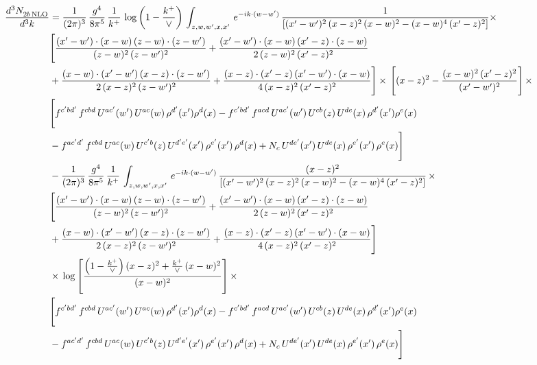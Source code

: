 \documentclass[9pt]{article}
\numberwithin{equation}{section}
\begin{document}
\begin{align}
    \frac{d^{3}N_{2b\,\rm NLO}^{\rm}}{d^{3}k}  & =  \frac{1}{(2\pi)^{3}}\, \frac{g^{4}}{8\pi^{5}}\,\frac{1}{k^{+}}\,\log{\left(1-\frac{k^{+}}{\vee}\right)}\,\int_{z,w,w^{\prime},x,x'}\, e^{-ik\cdot (w-w')}\, \frac{1}{\left[(x'-w')^{2}\,(x-z)^{2}\,(x-w)^{2} - (x-w)^{4}\, (x'-z)^{2}\right]} \times\notag \\ & \Bigg[\frac{(x'-w')\cdot (x-w)\, (z-w)\cdot (z-w')}{(z-w)^{2}\, (z-w')^{2}}+\frac{(x'-w')\cdot (x-w)\, (x'-z)\cdot (z-w)}{2\, (z-w)^{2}\, (x'-z)^{2}}\notag \\ & +\frac{(x-w)\cdot (x'-w')\, (x-z)\cdot (z-w')}{2\, (x-z)^{2}\, (z-w')^{2}}+\frac{(x-z)\cdot (x'-z)\, (x'-w')\cdot (x-w)}{4\, (x-z)^{2}\, (x'-z)^{2}}\Bigg] \times\,\Bigg[(x-z)^{2} - \frac{(x-w)^{2}\, (x'-z)^{2}}{(x'-w')^{2}}\Bigg]\,\times \notag \\ & \Bigg[f^{c'bd'}\,f^{cbd}\, U^{ac'}(w')\,U^{ac}(w)\,\rho^{d'}(x')\rho^{d}(x)- f^{c'bd'}\,f^{acd}\,U^{ac'}(w')\,U^{cb}(z)\,U^{de}(x)\,\rho^{d'}(x')\rho^{e}(x) \notag \\ & -f^{ac'd'}\,f^{cbd}\,U^{ac}(w)\,U^{c'b}(z)\,U^{d'e'}(x')\,\rho^{e'}(x')\,\rho^{d}(x) +N_{c}\,U^{de'}(x')\,U^{de}(x)\,\rho^{e'}(x')\,\rho^{e}(x)\Bigg] \notag \\
&  - \frac{1}{(2\pi)^{3}}\, \frac{g^{4}}{8\pi^{5}}\,\frac{1}{k^{+}}\,\int_{z,w,w^{\prime},x,x'}\, e^{-ik\cdot (w-w')}\, \frac{(x-z)^{2}}{\left[(x'-w')^{2}\,(x-z)^{2}\,(x-w)^{2} - (x-w)^{4}\, (x'-z)^{2}\right]}\,  \times\notag \\ & \Bigg[\frac{(x'-w')\cdot (x-w)\, (z-w)\cdot (z-w')}{(z-w)^{2}\, (z-w')^{2}}+\frac{(x'-w')\cdot (x-w)\, (x'-z)\cdot (z-w)}{2\, (z-w)^{2}\, (x'-z)^{2}}\notag \\ & +\frac{(x-w)\cdot (x'-w')\, (x-z)\cdot (z-w')}{2\, (x-z)^{2}\, (z-w')^{2}}+\frac{(x-z)\cdot (x'-z)\, (x'-w')\cdot (x-w)}{4\, (x-z)^{2}\, (x'-z)^{2}}\Bigg] \notag \\ & \times\,\log{\left[\frac{\left(1-\frac{k^{+}}{\vee}\right)(x-z)^{2}+\frac{k^{+}}{\vee}\,(x-w)^{2}}{(x-w)^{2}}\right]}\,\times \notag \\ & \Bigg[f^{c'bd'}\,f^{cbd}\, U^{ac'}(w')\,U^{ac}(w)\,\rho^{d'}(x')\rho^{d}(x)- f^{c'bd'}\,f^{acd}\,U^{ac'}(w')\,U^{cb}(z)\,U^{de}(x)\,\rho^{d'}(x')\rho^{e}(x) \notag \\ & -f^{ac'd'}\,f^{cbd}\,U^{ac}(w)\,U^{c'b}(z)\,U^{d'e'}(x')\,\rho^{e'}(x')\,\rho^{d}(x) +N_{c}\,U^{de'}(x')\,U^{de}(x)\,\rho^{e'}(x')\,\rho^{e}(x)\Bigg] \notag \\

\end{align}
\end{document}
